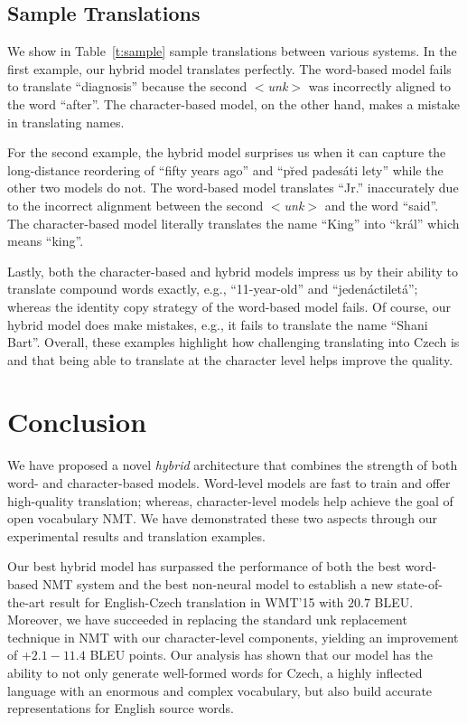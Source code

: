 \documentclass[11pt]{article}
\newcommand{\word}[1]{``#1''}
\newcommand{\unk}{$<${\it unk}$>$}
\newcommand{\ensbleu}{20.7}
\newcommand{\gain}{2.1{-}11.4}
\begin{document}
\subsection{Sample Translations}
\label{subsec:samples}

We show in Table~\ref{t:sample} sample translations between various systems. 
In the first example, our hybrid model translates perfectly. The word-based
model fails to translate \word{diagnosis} because the second \unk{} was incorrectly
aligned to the word \word{after}. The character-based model, on the other hand,
makes a mistake in translating names.

For the second example, the hybrid model surprises us when it can capture
the long-distance reordering of \word{fifty years ago} and \word{p\u{r}ed
pades\'ati lety} while the other two models do not. The word-based model
translates \word{Jr.} inaccurately due to the incorrect alignment between the
second \unk{} and the word \word{said}. The
character-based model literally translates the name \word{King} into \word{kr\'al}
which means \word{king}.

Lastly, both the character-based and hybrid models impress us by
their ability to translate compound words exactly, e.g., \word{11-year-old} and
\word{jeden\'actilet\'a}; whereas the identity copy
strategy of the word-based model fails.
Of course, our hybrid model does make mistakes, e.g., it fails to translate the name
\word{Shani Bart}. 
Overall, these examples highlight how challenging translating
into Czech is and that being able to translate at the character level helps
improve the quality.

\section{Conclusion}
\label{sec:conclude}
We have proposed a novel {\it hybrid} architecture that combines the strength
of both word- and character-based models. Word-level models are fast to train
and offer high-quality translation; whereas, character-level models help achieve
the goal of open vocabulary NMT. 
We have demonstrated these two aspects through our experimental results and
translation examples.

Our best hybrid model has surpassed the performance of both the best word-based
NMT system and the best non-neural model to establish a new state-of-the-art result for 
English-Czech translation in WMT'15 with $\ensbleu{}$ BLEU.
Moreover, we have succeeded in replacing the standard unk replacement technique
in NMT with our character-level components, yielding an improvement of 
+$\gain{}$ BLEU points. Our analysis has shown that our model has the ability to
not only generate well-formed words for
Czech, a highly inflected language with an enormous and complex vocabulary, but
also build accurate representations for English source words.
\end{document}
